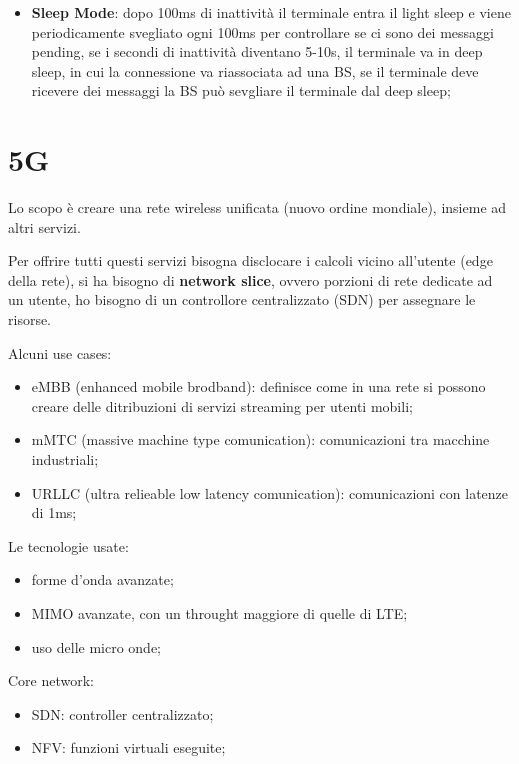 \documentclass[12pt]{article}
\begin{document}
\begin{itemize}
    \item \textbf{Sleep Mode}: dopo 100ms di inattivit\`a il terminale entra il light sleep e viene periodicamente svegliato ogni 100ms per controllare se ci sono dei messaggi pending, se i secondi di inattivit\`a diventano 5-10s, il terminale va in deep sleep, in cui la connessione va riassociata ad una BS, se il terminale deve ricevere dei messaggi la BS pu\`o sevgliare il terminale dal deep sleep;
\end{itemize}


\section{5G}
Lo scopo \`e creare una rete wireless unificata (nuovo ordine mondiale), insieme ad altri servizi.

Per offrire tutti questi servizi bisogna disclocare i calcoli vicino all'utente (edge della rete), si ha bisogno di \textbf{network slice}, ovvero porzioni di rete dedicate ad un utente, ho bisogno di un controllore centralizzato (SDN) per assegnare le risorse.

Alcuni use cases:
\begin{itemize}
    \item eMBB (enhanced mobile brodband): definisce come in una rete si possono creare delle ditribuzioni di servizi streaming per utenti mobili;
    \item mMTC (massive machine type comunication): comunicazioni tra macchine industriali;
    \item URLLC (ultra relieable low latency comunication): comunicazioni con latenze di 1ms;
\end{itemize}

Le tecnologie usate:
\begin{itemize}
    \item forme d'onda avanzate;
    \item MIMO avanzate, con un throught maggiore di quelle di LTE;
    \item uso delle micro onde;
\end{itemize}

Core network:
\begin{itemize}
    \item SDN: controller centralizzato;
    \item NFV: funzioni virtuali eseguite;
\end{itemize}
\end{document}
